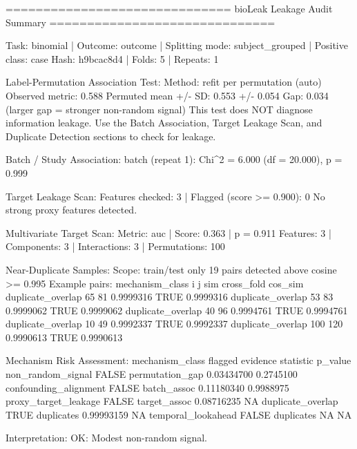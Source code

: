 \begin{CodeOutput}
==============================
 bioLeak Leakage Audit Summary
==============================

Task: binomial | Outcome: outcome | Splitting mode: subject_grouped | Positive class: case
Hash: h9bcac8d4 | Folds: 5 | Repeats: 1

Label-Permutation Association Test:
  Method: refit per permutation (auto)
  Observed metric: 0.588
  Permuted mean +/- SD: 0.553 +/- 0.054
  Gap: 0.034 (larger gap = stronger non-random signal)
  This test does NOT diagnose information leakage. Use the Batch Association,
  Target Leakage Scan, and Duplicate Detection sections to check for leakage.

Batch / Study Association:
  batch (repeat 1): Chi^2 = 6.000 (df = 20.000), p = 0.999

Target Leakage Scan:
  Features checked: 3 | Flagged (score >= 0.900): 0
  No strong proxy features detected.

Multivariate Target Scan:
  Metric: auc | Score: 0.363 | p = 0.911
  Features: 3 | Components: 3 | Interactions: 3 | Permutations: 100

Near-Duplicate Samples:
  Scope: train/test only
  19 pairs detected above cosine >= 0.995
  Example pairs:
   mechanism_class   i   j       sim cross_fold   cos_sim
 duplicate_overlap  65  81 0.9999316       TRUE 0.9999316
 duplicate_overlap  53  83 0.9999062       TRUE 0.9999062
 duplicate_overlap  40  96 0.9994761       TRUE 0.9994761
 duplicate_overlap  10  49 0.9992337       TRUE 0.9992337
 duplicate_overlap 100 120 0.9990613       TRUE 0.9990613

Mechanism Risk Assessment:
       mechanism_class flagged        evidence  statistic   p_value
     non_random_signal   FALSE permutation_gap 0.03434700 0.2745100
 confounding_alignment   FALSE     batch_assoc 0.11180340 0.9988975
  proxy_target_leakage   FALSE    target_assoc 0.08716235        NA
     duplicate_overlap    TRUE      duplicates 0.99993159        NA
    temporal_lookahead   FALSE      duplicates         NA        NA

Interpretation:
  OK: Modest non-random signal.
\end{CodeOutput}
